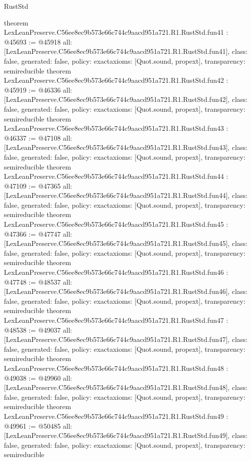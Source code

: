 \begin{lexlean}{RustStd}
\begin{coremodule}
{}
theorem LexLeanPreserve.C56ee8ec9b573e66c744c9aacd951a721.R1.RustStd.fun41 : @45693 := @45918 {
  all: [LexLeanPreserve.C56ee8ec9b573e66c744c9aacd951a721.R1.RustStd.fun41],
  class: false,
  generated: false,
  policy: exact{axioms: [Quot.sound, propext]},
  transparency: semireducible
}
theorem LexLeanPreserve.C56ee8ec9b573e66c744c9aacd951a721.R1.RustStd.fun42 : @45919 := @46336 {
  all: [LexLeanPreserve.C56ee8ec9b573e66c744c9aacd951a721.R1.RustStd.fun42],
  class: false,
  generated: false,
  policy: exact{axioms: [Quot.sound, propext]},
  transparency: semireducible
}
theorem LexLeanPreserve.C56ee8ec9b573e66c744c9aacd951a721.R1.RustStd.fun43 : @46337 := @47108 {
  all: [LexLeanPreserve.C56ee8ec9b573e66c744c9aacd951a721.R1.RustStd.fun43],
  class: false,
  generated: false,
  policy: exact{axioms: [Quot.sound, propext]},
  transparency: semireducible
}
theorem LexLeanPreserve.C56ee8ec9b573e66c744c9aacd951a721.R1.RustStd.fun44 : @47109 := @47365 {
  all: [LexLeanPreserve.C56ee8ec9b573e66c744c9aacd951a721.R1.RustStd.fun44],
  class: false,
  generated: false,
  policy: exact{axioms: [Quot.sound, propext]},
  transparency: semireducible
}
theorem LexLeanPreserve.C56ee8ec9b573e66c744c9aacd951a721.R1.RustStd.fun45 : @47366 := @47747 {
  all: [LexLeanPreserve.C56ee8ec9b573e66c744c9aacd951a721.R1.RustStd.fun45],
  class: false,
  generated: false,
  policy: exact{axioms: [Quot.sound, propext]},
  transparency: semireducible
}
theorem LexLeanPreserve.C56ee8ec9b573e66c744c9aacd951a721.R1.RustStd.fun46 : @47748 := @48537 {
  all: [LexLeanPreserve.C56ee8ec9b573e66c744c9aacd951a721.R1.RustStd.fun46],
  class: false,
  generated: false,
  policy: exact{axioms: [Quot.sound, propext]},
  transparency: semireducible
}
theorem LexLeanPreserve.C56ee8ec9b573e66c744c9aacd951a721.R1.RustStd.fun47 : @48538 := @49037 {
  all: [LexLeanPreserve.C56ee8ec9b573e66c744c9aacd951a721.R1.RustStd.fun47],
  class: false,
  generated: false,
  policy: exact{axioms: [Quot.sound, propext]},
  transparency: semireducible
}
theorem LexLeanPreserve.C56ee8ec9b573e66c744c9aacd951a721.R1.RustStd.fun48 : @49038 := @49960 {
  all: [LexLeanPreserve.C56ee8ec9b573e66c744c9aacd951a721.R1.RustStd.fun48],
  class: false,
  generated: false,
  policy: exact{axioms: [Quot.sound, propext]},
  transparency: semireducible
}
theorem LexLeanPreserve.C56ee8ec9b573e66c744c9aacd951a721.R1.RustStd.fun49 : @49961 := @50485 {
  all: [LexLeanPreserve.C56ee8ec9b573e66c744c9aacd951a721.R1.RustStd.fun49],
  class: false,
  generated: false,
  policy: exact{axioms: [Quot.sound, propext]},
  transparency: semireducible
}
\end{coremodule}
\end{lexlean}
